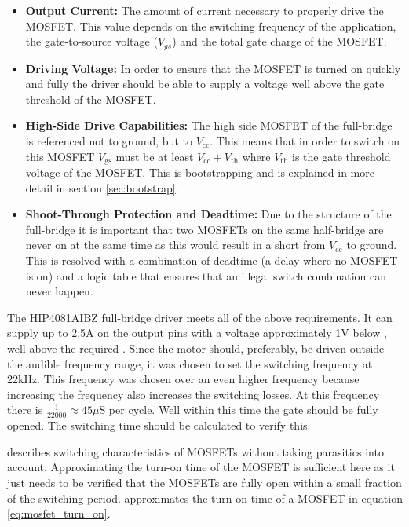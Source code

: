 \begin{itemize}
	\item \textbf{Output Current:} The amount of current necessary to properly drive the MOSFET.
	This value depends on the switching frequency of the application, the gate-to-source voltage ($V_{gs}$) and the total gate charge of the MOSFET.
	\item \textbf{Driving Voltage:} In order to ensure that the MOSFET is turned on quickly and fully the driver should be able to supply a voltage well above the gate threshold of the MOSFET.
	\item \textbf{High-Side Drive Capabilities:} The high side MOSFET of the full-bridge is referenced not to ground, but to $V_{\text{cc}}$.
	This means that in order to switch on this MOSFET $V_{\text{gs}}$ must be at least $V_{\text{cc}}+V_{\text{th}}$ where $V_{\text{th}}$ is the gate threshold voltage of the MOSFET.
	This is bootstrapping and is explained in more detail in section \ref{sec:bootstrap}.
	\item \textbf{Shoot-Through Protection and Deadtime:} Due to the structure of the full-bridge it is important that two MOSFETs on the same half-bridge are never on at the same time as this would result in a short from $V_{\text{cc}}$ to ground.
	This is resolved with a combination of deadtime (a delay where no MOSFET is on) and a logic table that ensures that an illegal switch combination can never happen.
\end{itemize}

The HIP4081AIBZ \cite{driver} full-bridge driver meets all of the above requirements.
It can supply up to 2.5A on the output pins with a voltage approximately 1V below \vcc, well above the required \vth.
Since the motor should, preferably, be driven outside the audible frequency range, it was chosen to set the switching frequency at 22kHz.
This frequency was chosen over an even higher frequency because increasing the frequency also increases the switching losses.
At this frequency there is $\frac{1}{22000}\approx45\mu$S per cycle. 
Well within this time the gate should be fully opened.
The switching time should be calculated to verify this.

\cite{mosfet_switch_app_note} describes switching characteristics of MOSFETs without taking parasitics into account.
Approximating the turn-on time of the MOSFET is sufficient here as it just needs to be verified that the MOSFETs are fully open within a small fraction of the switching period.
\cite{mosfet_switch_app_note} approximates the turn-on time of a MOSFET in equation \ref{eq:mosfet_turn_on}.


